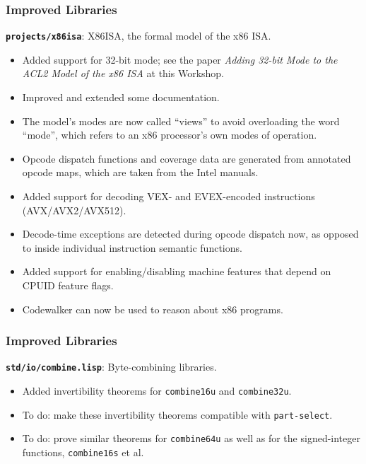 \documentclass{beamer}
\newcommand{\code}[1]{\texttt{#1}}
\newcommand{\bookpath}[1]{\textbf{\code{#1}}}
\newcommand{\implibtitle}{\frametitle{Improved Libraries}}
\begin{document}

\begin{frame}

\implibtitle

{\small
\bookpath{projects/x86isa}:
X86ISA, the formal model of the x86 ISA.
\begin{itemize}
\item
Added support for 32-bit mode; see the paper
\textit{Adding 32-bit Mode to the ACL2 Model of the x86 ISA}
at this Workshop.
\item
Improved and extended some documentation.
\item
The model's modes are now called ``views'' to avoid overloading the
word ``mode'', which refers to an x86 processor's own modes of
operation.
\item
Opcode dispatch functions and coverage data are generated from
annotated opcode maps, which are taken from the Intel manuals.
\item
Added support for decoding VEX- and EVEX-encoded instructions
(AVX/AVX2/AVX512).
\item
Decode-time exceptions are detected during opcode dispatch now, as
opposed to inside individual instruction semantic functions.
\item
Added support for enabling/disabling machine features that depend on
CPUID feature flags.
\item
Codewalker can now be used to reason about x86 programs.
\end{itemize}
}

\end{frame}


\begin{frame}

\implibtitle

\bookpath{std/io/combine.lisp}:
Byte-combining libraries.
\begin{itemize}
\item
Added invertibility theorems for \code{combine16u} and \code{combine32u}.
\item
To do: make these invertibility theorems compatible with \code{part-select}.
\item
To do: prove similar theorems for \code{combine64u} as well as for the
signed-integer functions, \code{combine16s} et al.
\end{itemize}

\end{frame}
\end{document}
